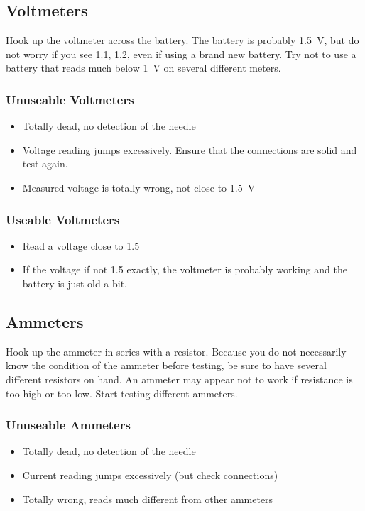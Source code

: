 \subsection{Voltmeters}
Hook up the voltmeter across the battery. The battery is probably 1.5~V, but
do not worry if you see 1.1, 1.2, even if using a brand new battery. Try not to
use a battery that reads much below 1~V on several different meters.  
\subsubsection{Unuseable Voltmeters}
\begin{itemize}
\item{Totally dead, no detection of the needle}
\item{Voltage reading jumps excessively. Ensure that the connections are solid
and test again.}
\item{Measured voltage is totally wrong, not close to 1.5~V}
\end{itemize}
\subsubsection{Useable Voltmeters}
\begin{itemize}
\item{Read a voltage close to 1.5}
\item{If the voltage if not 1.5 exactly, the voltmeter is probably working and the battery is just old a bit.}  
\end{itemize}
\subsection{Ammeters}
Hook up the ammeter in series with a resistor. Because you do not necessarily
know the condition of the ammeter before testing, be sure to have several different
resistors on hand. An ammeter may appear not to work if resistance is
too high or too low. Start testing different ammeters.  
\subsubsection{Unuseable Ammeters}
\begin{itemize}
\item{Totally dead, no detection of the needle}
\item{Current reading jumps excessively (but check connections)}
\item{Totally wrong, reads much different from other ammeters}
\end{itemize}

